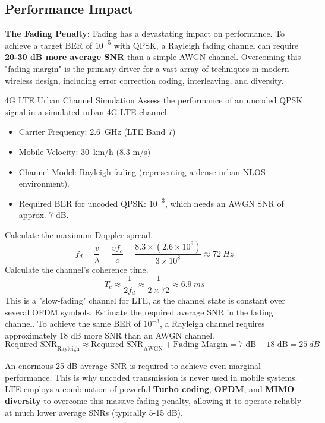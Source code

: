 \subsection{Performance Impact}

\begin{warningbox}
    \textbf{The Fading Penalty:} Fading has a devastating impact on performance. To achieve a target BER of $10^{-5}$ with QPSK, a Rayleigh fading channel can require \textbf{20-30 dB more average SNR} than a simple AWGN channel. Overcoming this "fading margin" is the primary driver for a vast array of techniques in modern wireless design, including error correction coding, interleaving, and diversity.
\end{warningbox}


\begin{workedexample}{4G LTE Urban Channel Simulation}
     Assess the performance of an uncoded QPSK signal in a simulated urban 4G LTE channel.
    \begin{itemize}
        \item Carrier Frequency: \qty{2.6}{GHz} (LTE Band 7)
        \item Mobile Velocity: \qty{30}{km/h} (8.3 m/s)
        \item Channel Model: Rayleigh fading (representing a dense urban NLOS environment).
        \item Required BER for uncoded QPSK: $10^{-3}$, which needs an AWGN SNR of approx. 7 dB.
    \end{itemize}
    \begin{derivationsteps}
        \step Calculate the maximum Doppler spread.
        \[ f_d = \frac{v}{\lambda} = \frac{v f_c}{c} = \frac{8.3 \times (2.6 \times 10^9)}{3 \times 10^8} \approx \qty{72}{Hz} \]
        \step Calculate the channel's coherence time.
        \[ T_c \approx \frac{1}{2f_d} \approx \frac{1}{2 \times 72} \approx \qty{6.9}{ms} \]
        This is a "slow-fading" channel for LTE, as the channel state is constant over several OFDM symbols.
        \step Estimate the required average SNR in the fading channel. To achieve the same BER of $10^{-3}$, a Rayleigh channel requires approximately 18 dB more SNR than an AWGN channel.
        \[ \text{Required SNR}_{\text{Rayleigh}} \approx \text{Required SNR}_{\text{AWGN}} + \text{Fading Margin} = 7 \text{ dB} + 18 \text{ dB} = \qty{25}{dB} \]
    \end{derivationsteps}
     An enormous 25 dB average SNR is required to achieve even marginal performance. This is why uncoded transmission is never used in mobile systems. LTE employs a combination of powerful \textbf{Turbo coding}, \textbf{OFDM}, and \textbf{MIMO diversity} to overcome this massive fading penalty, allowing it to operate reliably at much lower average SNRs (typically 5-15 dB).
\end{workedexample}


